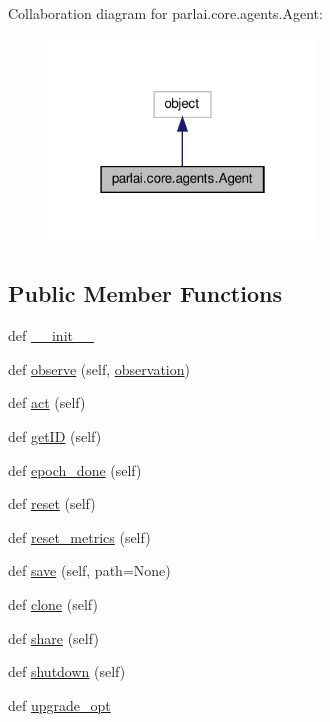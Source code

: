Collaboration diagram for parlai.\+core.\+agents.\+Agent\+:
\nopagebreak
\begin{figure}[H]
\begin{center}
\leavevmode
\includegraphics[width=202pt]{d1/d2f/classparlai_1_1core_1_1agents_1_1Agent__coll__graph}
\end{center}
\end{figure}
\subsection*{Public Member Functions}
\begin{DoxyCompactItemize}
\item 
def \hyperlink{classparlai_1_1core_1_1agents_1_1Agent_ade454c86dc623c46d218ca5544d49596}{\+\_\+\+\_\+init\+\_\+\+\_\+}
\item 
def \hyperlink{classparlai_1_1core_1_1agents_1_1Agent_a98041e2d186aa81bd5e1649a91f623bc}{observe} (self, \hyperlink{classparlai_1_1core_1_1agents_1_1Agent_aedbecc4b4aa7af7413882a0429e0f1db}{observation})
\item 
def \hyperlink{classparlai_1_1core_1_1agents_1_1Agent_a6a8abe0a98dd59bc39c9f12b163072db}{act} (self)
\item 
def \hyperlink{classparlai_1_1core_1_1agents_1_1Agent_a29e1cdd729ac4236f8bae90b2e66fa04}{get\+ID} (self)
\item 
def \hyperlink{classparlai_1_1core_1_1agents_1_1Agent_a40157e237ea85d75ebc3fd248c7a1a1b}{epoch\+\_\+done} (self)
\item 
def \hyperlink{classparlai_1_1core_1_1agents_1_1Agent_a27cb8206372681605b00dc28b81a7c39}{reset} (self)
\item 
def \hyperlink{classparlai_1_1core_1_1agents_1_1Agent_aaefcbd7c61d319b368b3ee13997c8c99}{reset\+\_\+metrics} (self)
\item 
def \hyperlink{classparlai_1_1core_1_1agents_1_1Agent_a51e706e3e5389c9b48c7a1589d97ec99}{save} (self, path=None)
\item 
def \hyperlink{classparlai_1_1core_1_1agents_1_1Agent_a2525db5bdd19a3bf5b0669bfa158f9ff}{clone} (self)
\item 
def \hyperlink{classparlai_1_1core_1_1agents_1_1Agent_afbbb06bf0f46ff927c8b186726a68b47}{share} (self)
\item 
def \hyperlink{classparlai_1_1core_1_1agents_1_1Agent_a801e5ca2a5e8e96a72f0c04549008e8f}{shutdown} (self)
\item 
def \hyperlink{classparlai_1_1core_1_1agents_1_1Agent_ad6e5ea0357c43169d97b329566a33ee5}{upgrade\+\_\+opt}
\end{DoxyCompactItemize}
